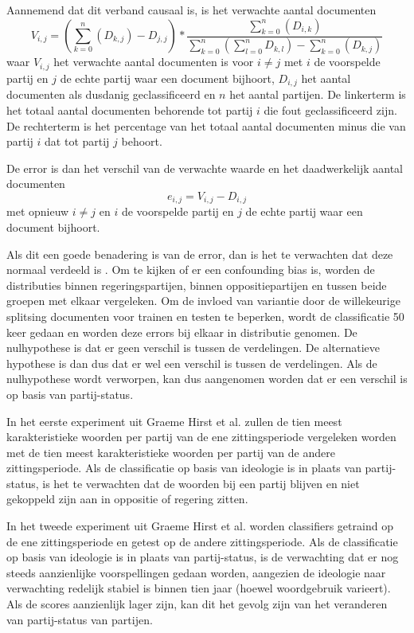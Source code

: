 Aannemend dat dit verband causaal is, is het verwachte aantal documenten
\begin{equation}
V_{i,j}  = (\sum_{k=0}^{n}{(D_{k,j})} -D_{j,j}) *  \frac{\sum_{k=0}^{n}{(D_{i,k})}}{\sum_{k=0}^{n}{(\sum_{l=0}^{n}{D_{k,l}})} - \sum_{k=0}^{n}{(D_{k,j})}}
\end{equation}
waar $V_{i,j}$ het verwachte aantal documenten is voor $i\neq j$ met $i$ de voorspelde partij en $j$ de echte partij waar een document bijhoort, $D_{i,j}$ het aantal documenten als dusdanig geclassificeerd en $n$ het aantal partijen. De linkerterm is het totaal aantal documenten behorende tot partij $i$ die fout geclassificeerd zijn. De rechterterm is het percentage van het totaal aantal documenten minus die van partij $i$ dat tot partij $j$ behoort.\par
De error is dan het verschil van de verwachte waarde en het daadwerkelijk aantal documenten
\begin{equation}
e_{i,j} = V_{i,j} - D_{i,j}
\end{equation}
met opnieuw $i\neq j$ en $i$ de voorspelde partij en $j$ de echte partij waar een document bijhoort. \par
Als dit een goede benadering is van de error, dan is het te verwachten dat deze normaal verdeeld is \cite{citeulike:7531484}. Om te kijken of er een confounding bias is, worden de distributies binnen regeringspartijen, binnen oppositiepartijen en tussen beide groepen met elkaar vergeleken. Om de invloed van variantie door de willekeurige splitsing documenten voor trainen en testen te beperken, wordt de classificatie 50 keer gedaan en worden deze errors bij elkaar in distributie genomen. De nulhypothese is dat er geen verschil is tussen de verdelingen. De alternatieve hypothese is dan dus dat er wel een verschil is tussen de verdelingen. Als de nulhypothese wordt verworpen, kan dus aangenomen worden dat er een verschil is op basis van partij-status.\par
In het eerste experiment uit Graeme Hirst et al. zullen de tien meest karakteristieke woorden per partij van de ene zittingsperiode vergeleken worden met de tien meest karakteristieke woorden per partij van de andere zittingsperiode. Als de classificatie op basis van ideologie is in plaats van partij-status, is het te verwachten dat de woorden bij een partij blijven en niet gekoppeld zijn aan in oppositie of regering zitten. \par
In het tweede experiment uit Graeme Hirst et al. worden classifiers getraind op de ene zittingsperiode en getest op de andere zittingsperiode. Als de classificatie op basis van ideologie is in plaats van partij-status, is de verwachting dat er nog steeds aanzienlijke voorspellingen gedaan worden, aangezien de ideologie naar verwachting redelijk stabiel is binnen tien jaar (hoewel woordgebruik varieert). Als de scores aanzienlijk lager zijn, kan dit het gevolg zijn van het veranderen van partij-status van partijen.\par
